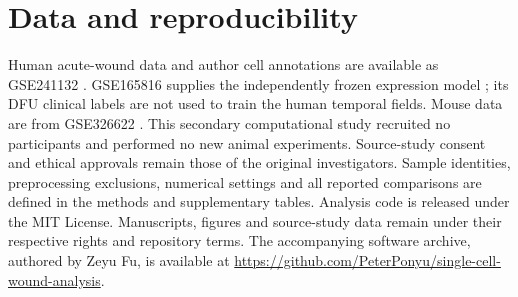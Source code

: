 \documentclass[10pt,a4paper]{article}
\begin{document}
\section*{Data and reproducibility}
Human acute-wound data and author cell annotations are available as GSE241132 \citep{liu2025_wound,geo_gse241132}. GSE165816 supplies the independently frozen expression model \citep{theocharidis2022}; its DFU clinical labels are not used to train the human temporal fields. Mouse data are from GSE326622 \citep{geo_gse326622}. This secondary computational study recruited no participants and performed no new animal experiments. Source-study consent and ethical approvals remain those of the original investigators. Sample identities, preprocessing exclusions, numerical settings and all reported comparisons are defined in the methods and supplementary tables.
Analysis code is released under the MIT License. Manuscripts, figures and source-study data remain under their respective rights and repository terms. The accompanying software archive, authored by Zeyu Fu, is available at \url{https://github.com/PeterPonyu/single-cell-wound-analysis}.
\FloatBarrier



\end{document}
